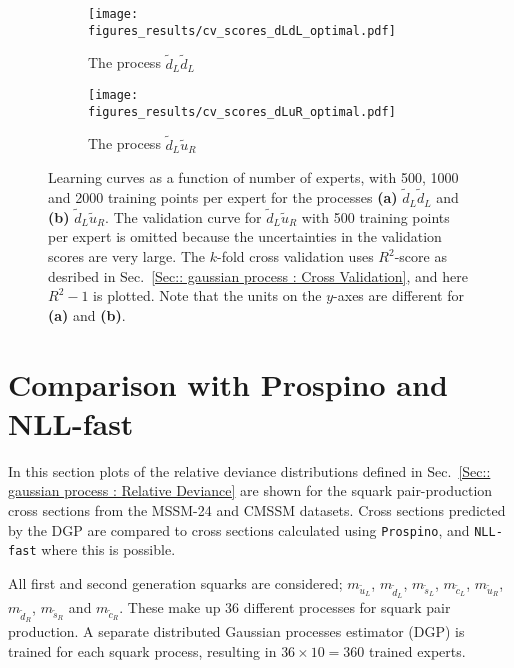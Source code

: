 \documentclass[twoside,english]{uiofysmaster}
\begin{document}
{\begin{figure}
    \centering
    \begin{subfigure}[b]{0.7\textwidth}
        \texttt{[image: figures\_results/cv\_scores\_dLdL\_optimal.pdf]}
        \caption{The process $\widetilde{d}_L \widetilde{d}_L$}
        \label{Fig:: results : Learning curves dLdL}
    \end{subfigure}
    \begin{subfigure}[b]{0.7\textwidth}
        \texttt{[image: figures\_results/cv\_scores\_dLuR\_optimal.pdf]}
        \caption{The process $\widetilde{d}_L \widetilde{u}_R$}
        \label{Fig :: results : Learning curves dLuL}
    \end{subfigure}
    \caption{Learning curves as a function of number of experts, with 500, 1000 and 2000 training points per expert for the processes \textbf{(a)} $\widetilde{d}_L \widetilde{d}_L$ and \textbf{(b)} $\widetilde{d}_L\widetilde{u}_R$. The validation curve for $\widetilde{d}_L \widetilde{u}_R$ with 500 training points per expert is omitted because the uncertainties in the validation scores are very large. The $k$-fold cross validation uses $R^2$-score as desribed in Sec.~\ref{Sec:: gaussian process : Cross Validation}, and here $R^2-1$ is plotted. Note that the units on the $y$-axes are different for \textbf{(a)} and \textbf{(b)}.}
\label{Fig:: results : Learning curves}
\end{figure}


\section{Comparison with Prospino and NLL-fast}

In this section plots of the relative deviance distributions defined in Sec.~\ref{Sec:: gaussian process : Relative Deviance} are shown for the squark pair-production cross sections from the MSSM-24 and CMSSM datasets. Cross sections predicted by the DGP are compared to cross sections calculated using \verb|Prospino|, and \verb|NLL-fast| where this is possible. 

All first and second generation squarks are considered; $m_{\widetilde{u}_L}$, $m_{\widetilde{d}_L}$, $m_{\widetilde{s}_L}$, $m_{\widetilde{c}_L}$, $m_{\widetilde{u}_R}$, $m_{\widetilde{d}_R}$, $m_{\widetilde{s}_R}$ and $m_{\widetilde{c}_R}$. These make up 36 different processes for squark pair production. A separate distributed Gaussian processes estimator (DGP) is trained for each squark process, resulting in $36 \times 10 = 360$ trained experts. 


}
\end{document}
